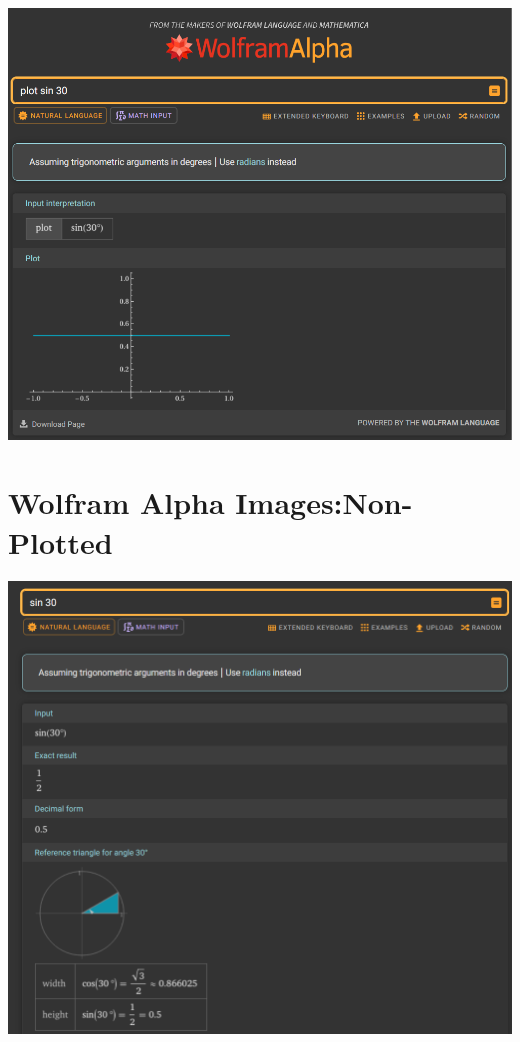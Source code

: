 \documentclass[a4paper, oneside, 11pt]{report}
\begin{document}
    \includegraphics[width=160mm]{Screenshot 2025-01-03 161746.png} \\

    \section{Wolfram Alpha Images:Non-Plotted}\label{WolframUnplotted}

    \includegraphics[width = 160mm]{Screenshot 2025-01-03 162013.png} \\

    \label{app:other}
\end{document}
